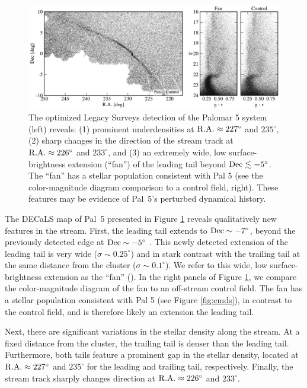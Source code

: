 \documentclass[twocolumn]{aastex62}
\newcommand{\sa}[1]{{\color{magenta} SP: #1}}
\begin{document}
\begin{figure}
\begin{center}
\includegraphics[width=\textwidth]{map_fancmd.pdf}
\end{center}
\caption{
The optimized Legacy Surveys detection of the Palomar 5 system (left) reveals: (1) prominent underdensities at $\rm R.A.\approx 227^\circ$ and $235^\circ$, (2) sharp changes in the direction of the stream track at $\rm R.A.\approx 226^\circ$ and $233^\circ$, and (3) an extremely wide, low surface-brightness extension (``fan'') of the leading tail beyond $\rm Dec\lesssim-5^\circ$. The ``fan''  has a stellar population consistent with Pal 5 (see the color-magnitude diagram comparison to a control field, right).
These features may be evidence of Pal~5's perturbed dynamical history.
}
\label{fig:map}
\end{figure}

The DECaLS map of Pal~5 presented in Figure \ref{fig:map} reveals qualitatively new features in the stream.
First, the leading tail extends to $\rm Dec\sim-7^\circ$, beyond the previously detected edge at $\rm Dec\sim -5^\circ$ \citep{Bernard:2016}.
This newly detected extension of the leading tail is very wide ($\sigma\sim 0.25^\circ$) and in stark contrast with the trailing tail at the same distance from the cluster ($\sigma\sim 0.1^\circ$). We refer to this wide, low surface-brightness extension as the ``fan'' (\citealt{Pearson:2015}).
In the right panels of Figure \ref{fig:map}, we compare the color-magnitude diagram of the fan to an off-stream control field.
The fan has a stellar population consistent with Pal 5 (see Figure \ref{fig:cmds}), in contrast to the control field, and is therefore likely an extension the leading tail.

Next, there are significant variations in the stellar density along the stream.
At a fixed distance from the cluster, the trailing tail is denser than the leading tail.
Furthermore, both tails feature a prominent gap in the stellar density, located at $\rm R.A.\approx 227^\circ$ and $235^\circ$ for the leading and trailing tail, respectively.
Finally, the stream track sharply changes direction at $\rm R.A.\approx 226^\circ$ and $233^\circ$.
\end{document}
